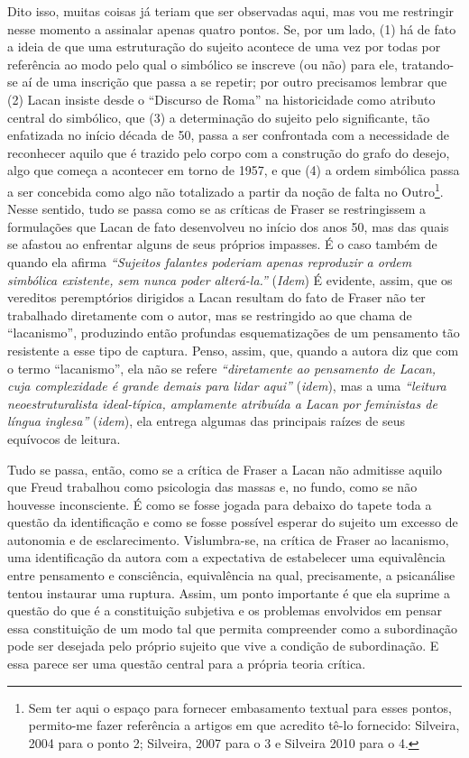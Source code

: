 Dito isso, muitas coisas já teriam que ser observadas aqui, mas vou me
restringir nesse momento a assinalar apenas quatro pontos. Se, por um
lado, (1) há de fato a ideia de que uma estruturação do sujeito acontece
de uma vez por todas por referência ao modo pelo qual o simbólico se
inscreve (ou não) para ele, tratando-se aí de uma inscrição que passa a
se repetir; por outro precisamos lembrar que (2) Lacan insiste desde o
``Discurso de Roma'' na historicidade como atributo central do
simbólico, que (3) a determinação do sujeito pelo significante, tão
enfatizada no início década de 50, passa a ser confrontada com a
necessidade de reconhecer aquilo que é trazido pelo corpo com a
construção do grafo do desejo, algo que começa a acontecer em torno de
1957, e que (4) a ordem simbólica passa a ser concebida como algo não
totalizado a partir da noção de falta no Outro\footnote{Sem ter aqui o
  espaço para fornecer embasamento textual para esses pontos, permito-me
  fazer referência a artigos em que acredito tê-lo fornecido: Silveira,
  2004 para o ponto 2; Silveira, 2007 para o 3 e Silveira 2010 para o 4.}.
Nesse sentido, tudo se passa como se as críticas de Fraser se
restringissem a formulações que Lacan de fato desenvolveu no início dos
anos 50, mas das quais se afastou ao enfrentar alguns de seus próprios
impasses. É o caso também de quando ela afirma \emph{``Sujeitos falantes
poderiam apenas reproduzir a ordem simbólica existente, sem nunca poder
alterá-la.''} (\emph{Idem}) É evidente, assim, que os vereditos
peremptórios dirigidos a Lacan resultam do fato de Fraser não ter
trabalhado diretamente com o autor, mas se restringido ao que chama de
``lacanismo'', produzindo então profundas esquematizações de um
pensamento tão resistente a esse tipo de captura. Penso, assim, que,
quando a autora diz que com o termo ``lacanismo'', ela não se refere
\emph{``diretamente ao pensamento de Lacan, cuja complexidade é grande
demais para lidar aqui''} (\emph{idem}), mas a uma \emph{``leitura
neoestruturalista ideal-típica, amplamente atribuída a Lacan por
feministas de língua inglesa''} (\emph{idem}), ela entrega algumas das
principais raízes de seus equívocos de leitura.

Tudo se passa, então, como se a crítica de Fraser a Lacan não admitisse
aquilo que Freud trabalhou como psicologia das massas e, no fundo, como
se não houvesse inconsciente. É como se fosse jogada para debaixo do
tapete toda a questão da identificação e como se fosse possível esperar
do sujeito um excesso de autonomia e de esclarecimento. Vislumbra-se, na
crítica de Fraser ao lacanismo, uma identificação da autora com a
expectativa de estabelecer uma equivalência entre pensamento e
consciência, equivalência na qual, precisamente, a psicanálise tentou
instaurar uma ruptura. Assim, um ponto importante é que ela suprime a
questão do que é a constituição subjetiva e os problemas envolvidos em
pensar essa constituição de um modo tal que permita compreender como a
subordinação pode ser desejada pelo próprio sujeito que vive a condição
de subordinação. E essa parece ser uma questão central para a própria
teoria crítica.

